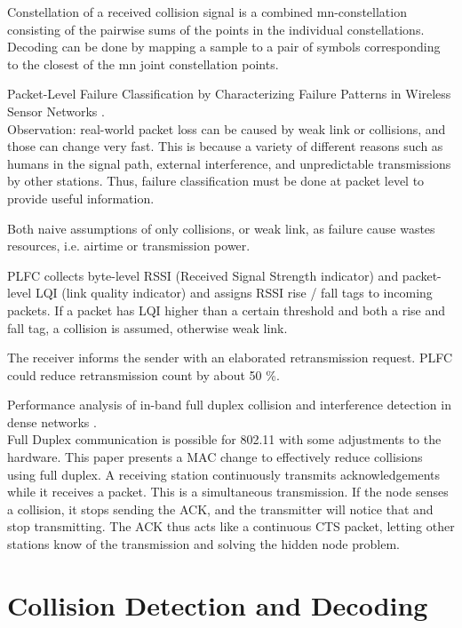Constellation of a received collision signal is a combined mn-constellation consisting of the pairwise sums of the points in the individual constellations. Decoding can be done by mapping a sample to a pair of symbols corresponding to the closest of the mn joint constellation points.

Packet-Level Failure Classification by Characterizing Failure Patterns in Wireless Sensor Networks \cite{zhu2016}.\\

Observation: real-world packet loss can be caused by weak link or collisions, and those can change very fast. This is because a variety of different reasons such as humans in the signal path, external interference, and unpredictable transmissions by other stations. Thus, failure classification must be done at packet level to provide useful information.

Both naive assumptions of only collisions, or weak link, as failure cause wastes resources, i.e. airtime or transmission power.

PLFC collects byte-level RSSI (Received Signal Strength indicator) and packet-level LQI (link quality indicator) and assigns RSSI rise / fall tags to incoming packets. If a packet has LQI higher than a certain threshold and both a rise and fall tag, a collision is assumed, otherwise weak link.

The receiver informs the sender with an elaborated retransmission request. PLFC could reduce retransmission count by about 50 \%.

Performance analysis of in-band full duplex collision and interference detection in dense networks \cite{vermeulen2016}.\\

Full Duplex communication is possible for 802.11 with some adjustments to the hardware. This paper presents a MAC change to effectively reduce collisions using full duplex. A receiving station continuously transmits acknowledgements while it receives a packet. This is a simultaneous transmission. If the node senses a collision, it stops sending the ACK, and the transmitter will notice that and stop transmitting. The ACK thus acts like a continuous CTS packet, letting other stations know of the transmission and solving the hidden node problem.



\section{Collision Detection and Decoding}


